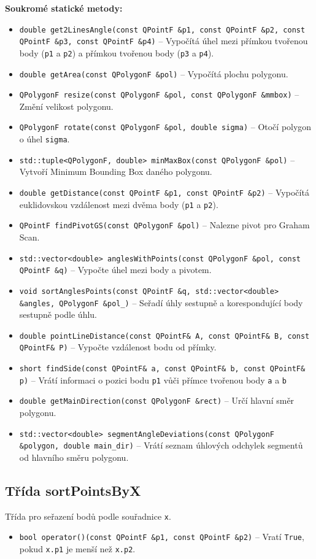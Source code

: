 \textbf{Soukromé statické metody:}
\begin{itemize}
\item \texttt{double get2LinesAngle(const QPointF \&p1, const QPointF \&p2, const QPointF \&p3, const QPointF \&p4)} – Vypočítá úhel mezi přímkou tvořenou body (\texttt{p1} a \texttt{p2}) a přímkou tvořenou body (\texttt{p3} a \texttt{p4}).
\item \texttt{double getArea(const QPolygonF \&pol)} – Vypočítá plochu polygonu.
\item \texttt{QPolygonF resize(const QPolygonF \&pol, const QPolygonF \&mmbox)} – Změní velikost polygonu.
\item \texttt{QPolygonF rotate(const QPolygonF \&pol, double sigma)} – Otočí polygon o úhel \texttt{sigma}.
\item \texttt{std::tuple<QPolygonF, double> minMaxBox(const QPolygonF \&pol)} – Vytvoří Minimum Bounding Box daného polygonu.
\item \texttt{double getDistance(const QPointF \&p1, const QPointF \&p2)} – Vypočítá euklidovskou vzdálenost mezi dvěma body (\texttt{p1} a \texttt{p2}).
\item \texttt{QPointF findPivotGS(const QPolygonF \&pol)} – Nalezne pivot pro Graham Scan.
\item \texttt{std::vector<double> anglesWithPoints(const QPolygonF \&pol, const QPointF \&q)} – Vypočte úhel mezi body a pivotem.
\item \texttt{void sortAnglesPoints(const QPointF \&q, std::vector<double> \&angles, QPolygonF \&pol\_)} – Seřadí úhly sestupně a korespondující body sestupně podle úhlu.
\item \texttt{double pointLineDistance(const QPointF\& A, const QPointF\& B, const QPointF\& P)} – Vypočte vzdálenost bodu od přímky.
\item \texttt{short findSide(const QPointF\& a, const QPointF\& b, const QPointF\& p)} – Vrátí informaci o pozici bodu \texttt{p1} vůči přímce tvořenou body \texttt{a} a \texttt{b}
\item \texttt{double getMainDirection(const QPolygonF \&rect)} – Určí hlavní směr polygonu.
\item \texttt{std::vector<double> segmentAngleDeviations(const QPolygonF \&polygon, double main\_dir)} – Vrátí seznam úhlových odchylek segmentů od hlavního směru polygonu.
\end{itemize}

\subsection{Třída sortPointsByX}
Třída pro seřazení bodů podle souřadnice \texttt{x}.
\begin{itemize}
    \item \texttt{bool  operator()(const QPointF \&p1, const QPointF \&p2)} – Vratí \texttt{True}, pokud \texttt{x.p1} je menší než \texttt{x.p2}.
\end{itemize}

